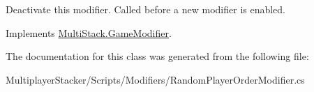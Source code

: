 Deactivate this modifier. Called before a new modifier is enabled. 



Implements \hyperlink{class_multi_stack_1_1_game_modifier_abe04db6ab31f5e5063739d8e5a3f7ad1}{Multi\+Stack.\+Game\+Modifier}.



The documentation for this class was generated from the following file\+:\begin{DoxyCompactItemize}
\item 
Multiplayer\+Stacker/\+Scripts/\+Modifiers/Random\+Player\+Order\+Modifier.\+cs\end{DoxyCompactItemize}
